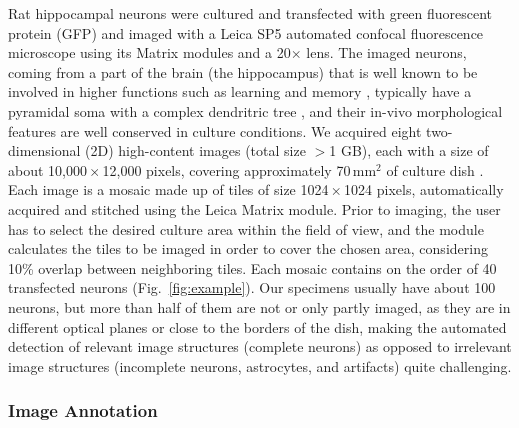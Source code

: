 
Rat hippocampal neurons were cultured and transfected with green fluorescent protein (GFP) and imaged with a Leica SP5 automated confocal fluorescence microscope using its Matrix modules and a 20$\times$ lens. The imaged neurons, coming from a part of the brain (the hippocampus) that is well known to be involved in higher functions such as learning and memory \citep{S92}, typically have a pyramidal soma with a complex dendritric tree \citep{GAB98}, and their in-vivo morphological features are well conserved in culture conditions. We acquired eight two-dimensional (2D) high-content images (total size $>$1 GB), each with a size of about 10,000\,$\times$\,12,000 pixels, covering approximately 70\,mm${}^2$ of culture dish {\color{red}. Each image is a mosaic made up of tiles of size 1024\,$\times$\,1024 pixels, automatically acquired and stitched using the Leica Matrix module. Prior to imaging, the user has to select the desired culture area within the field of view, and the module calculates the tiles to be imaged in order to cover the chosen area, considering 10\% overlap between neighboring tiles. Each mosaic contains} on the order of 40 transfected neurons (Fig.\ \ref{fig:example}). Our specimens usually have about 100 neurons, but more than half of them are not or only partly imaged, as they are in different optical planes or close to the borders of the dish, making the automated detection of relevant image structures (complete neurons) as opposed to irrelevant image structures (incomplete neurons, astrocytes, and artifacts) quite challenging.

\subsubsection{Image Annotation}
\label{sec:annotation}

